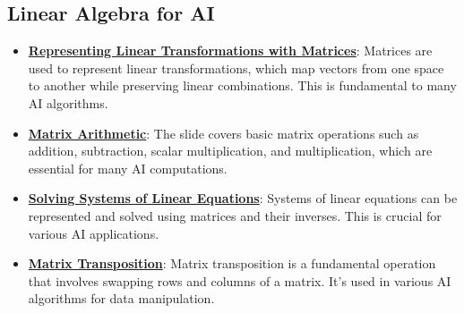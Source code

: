 \documentclass{article}%
\begin{document}
%
\subsection{Linear Algebra for AI}%
\label{subsec:LinearAlgebraforAI}%
\begin{itemize}[leftmargin=*]%
\item \href{\url{https://purdue.brightspace.com/d2l/common/assets/pdfjs-d2l-dist/1.0.14-legacy/web/viewer.html?file=\%252Fcontent\%252Fenforced\%252F1095467-wl.202510.CS.24300.001\%252F04L1-Linear\%20Algebra\%20Primer.pdf\%253Fou\%253D1095467\&lang=en-us\&container=d2l-fileviewer-rendered-pdf\&fullscreen=d2l-fileviewer-rendered-pdf-dialog\&height=667}#page=5}{\textbf{Representing Linear Transformations with Matrices}}: Matrices are used to represent linear transformations, which map vectors from one space to another while preserving linear combinations. This is fundamental to many AI algorithms.%
\item \href{\url{https://purdue.brightspace.com/d2l/common/assets/pdfjs-d2l-dist/1.0.14-legacy/web/viewer.html?file=\%252Fcontent\%252Fenforced\%252F1095467-wl.202510.CS.24300.001\%252F04L1-Linear\%20Algebra\%20Primer.pdf\%253Fou\%253D1095467\&lang=en-us\&container=d2l-fileviewer-rendered-pdf\&fullscreen=d2l-fileviewer-rendered-pdf-dialog\&height=667}#page=9}{\textbf{Matrix Arithmetic}}: The slide covers basic matrix operations such as addition, subtraction, scalar multiplication, and multiplication, which are essential for many AI computations.%
\item \href{\url{https://purdue.brightspace.com/d2l/common/assets/pdfjs-d2l-dist/1.0.14-legacy/web/viewer.html?file=\%252Fcontent\%252Fenforced\%252F1095467-wl.202510.CS.24300.001\%252F04L1-Linear\%20Algebra\%20Primer.pdf\%253Fou\%253D1095467\&lang=en-us\&container=d2l-fileviewer-rendered-pdf\&fullscreen=d2l-fileviewer-rendered-pdf-dialog\&height=667}#page=11}{\textbf{Solving Systems of Linear Equations}}: Systems of linear equations can be represented and solved using matrices and their inverses. This is crucial for various AI applications.%
\item \href{\url{https://purdue.brightspace.com/d2l/common/assets/pdfjs-d2l-dist/1.0.14-legacy/web/viewer.html?file=\%252Fcontent\%252Fenforced\%252F1095467-wl.202510.CS.24300.001\%252F04L1-Linear\%20Algebra\%20Primer.pdf\%253Fou\%253D1095467\&lang=en-us\&container=d2l-fileviewer-rendered-pdf\&fullscreen=d2l-fileviewer-rendered-pdf-dialog\&height=667}#page=16}{\textbf{Matrix Transposition}}: Matrix transposition is a fundamental operation that involves swapping rows and columns of a matrix. It's used in various AI algorithms for data manipulation.%

\end{itemize}
\end{document}
